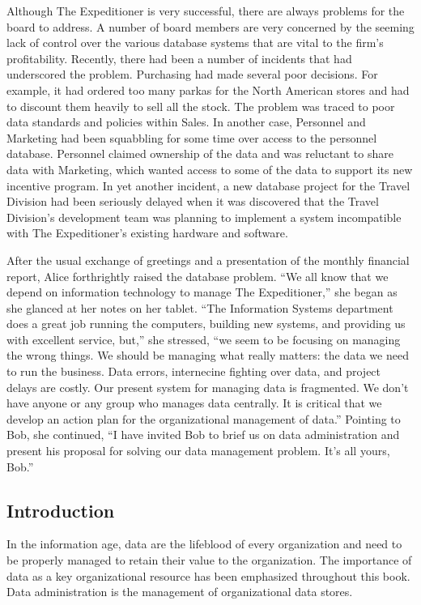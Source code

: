 \documentclass[
]{article}
\begin{document}
Although The Expeditioner is very successful, there are always problems
for the board to address. A number of board members are very concerned
by the seeming lack of control over the various database systems that
are vital to the firm's profitability. Recently, there had been a number
of incidents that had underscored the problem. Purchasing had made
several poor decisions. For example, it had ordered too many parkas for
the North American stores and had to discount them heavily to sell all
the stock. The problem was traced to poor data standards and policies
within Sales. In another case, Personnel and Marketing had been
squabbling for some time over access to the personnel database.
Personnel claimed ownership of the data and was reluctant to share data
with Marketing, which wanted access to some of the data to support its
new incentive program. In yet another incident, a new database project
for the Travel Division had been seriously delayed when it was
discovered that the Travel Division's development team was planning to
implement a system incompatible with The Expeditioner's existing
hardware and software.

After the usual exchange of greetings and a presentation of the monthly
financial report, Alice forthrightly raised the database problem. ``We
all know that we depend on information technology to manage The
Expeditioner,'' she began as she glanced at her notes on her tablet. ``The
Information Systems department does a great job running the computers,
building new systems, and providing us with excellent service, but,'' she
stressed, ``we seem to be focusing on managing the wrong things. We
should be managing what really matters: the data we need to run the
business. Data errors, internecine fighting over data, and project
delays are costly. Our present system for managing data is fragmented.
We don't have anyone or any group who manages data centrally. It is
critical that we develop an action plan for the organizational
management of data.'' Pointing to Bob, she continued, ``I have invited Bob
to brief us on data administration and present his proposal for solving
our data management problem. It's all yours, Bob.''

\hypertarget{introduction-5}{%
\subsection*{Introduction}\label{introduction-5}}

In the information age, data are the lifeblood of every organization and
need to be properly managed to retain their value to the organization.
The importance of data as a key organizational resource has been
emphasized throughout this book. Data administration is the management
of organizational data stores.
\end{document}
